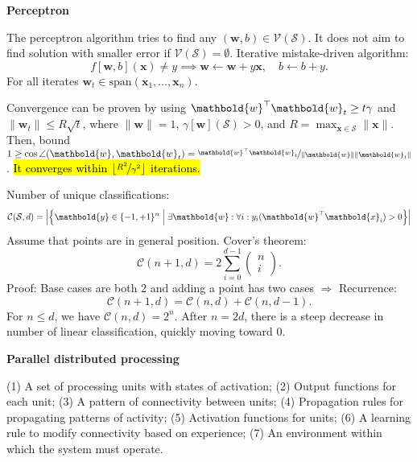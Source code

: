 \documentclass[10pt]{article}
\newenvironment{topic}[1]
{\textbf{\sffamily \footnotesize \colorbox{black}{\rlap{\textbf{\textcolor{white}{#1}}}\hspace{\linewidth}\hspace{-2\fboxsep}}}}
{}
\newenvironment{subtopic}[1]
{\begin{center}\textbf{\footnotesize \sffamily #1}\end{center}}
{}
\renewcommand{\vec}[1]{\ensuremath{\mathbold{#1}}}
\begin{document}
\begin{multicols*}{3}
\begin{topic}{Connectionism}
\begin{subtopic}{Perceptron}
            The perceptron algorithm tries to find any $(\vec{w},b) \in \mathcal{V}(\mathcal{S})$. It does not
            aim to find solution with smaller error if $\mathcal{V}(\mathcal{S}) = \emptyset$. Iterative
            mistake-driven algorithm: \[
                f[\vec{w},b](\vec{x}) \neq y \implies \vec{w} \gets \vec{w} + y \vec{x}, \quad b \gets b + y.
            \]
            For all iterates $\vec{w}_t \in \mathrm{span}(\vec{x}_1, \ldots, \vec{x}_n)$.

            Convergence can be proven by using $\transpose{\vec{w}} \vec{w}_t \geq t \gamma$ and $\| \vec{w}_t
                \| \leq R \sqrt{t}$, where $\| \vec{w} \| = 1$, $\gamma[\vec{w}](\mathcal{S}) > 0$, and $R =
                \max_{\vec{x} \in \mathcal{S}} \| \vec{x} \|$. Then, bound $1 \geq \cos\angle{(\vec{w},\vec{w}_t)}
                = \nicefrac{\transpose{\vec{w}} \vec{w}_t}{\| \vec{w} \| \| \vec{w}_t \|}$. \hl{It converges within
                $\lfloor \nicefrac{R^2}{\gamma^2} \rfloor$ iterations.}

            Number of unique classifications: \[
                \mathcal{C}(\mathcal{S},d) = \lft| \lft\{ \vec{y} \in \{ -1,+1 \}^n \;\middle|\; \exists \vec{w} : \forall i : y_i (\transpose{\vec{w}}\vec{x}_i) > 0 \rgt\} \rgt|
            \]
            Assume that points are in general position. Cover's theorem: \[
                \mathcal{C}(n+1,d) = 2 \sum_{i=0}^{d-1} \begin{pmatrix} n \\ i \end{pmatrix}.
            \]
            Proof: Base cases are both 2 and adding a point has two cases $\Rightarrow$ Recurrence: \[
                \mathcal{C}(n+1,d) = \mathcal{C}(n,d) + \mathcal{C}(n,d-1).
            \]
            For $n \leq d$, we have $\mathcal{C}(n,d) = 2^n$. After $n=2d$, there is a steep decrease in number
            of linear classification, quickly moving toward $0$.
        \end{subtopic}

        \begin{subtopic}{Parallel distributed processing}
            (1) A set of processing units with states of activation; (2) Output functions for each
            unit; (3) A pattern of connectivity between units; (4) Propagation rules for propagating
            patterns of activity; (5) Activation functions for units; (6) A learning rule to modify
            connectivity based on experience; (7) An environment within which the system must operate.
        \end{subtopic}


\end{topic}
\end{multicols*}
\end{document}
